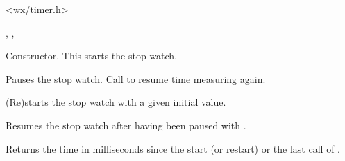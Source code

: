 
<wx/timer.h>


, , 




Constructor. This starts the stop watch.

\label{wxstopwatchpause}


Pauses the stop watch. Call  to resume 
time measuring again.



(Re)starts the stop watch with a given initial value.

\label{wxstopwatchresume}


Resumes the stop watch after having been paused with .


\label{wxstopwatchtime}

Returns the time in milliseconds since the start (or restart) or the last call of 
.

